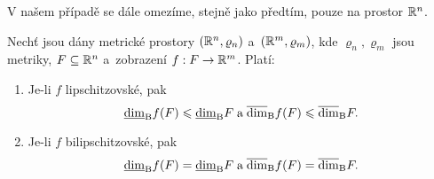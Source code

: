 V našem případě se dále omezíme, stejně jako předtím, pouze na prostor $\mathbb{R}^n$.

\begin{theorem}\label{thm:bc-dimenze-bi-lipschitzovska-zobrazeni}
    Nechť jsou dány metrické prostory $(\mathbb{R}^n,\varrho_n)$ a~$(\mathbb{R}^m,\varrho_m)$, kde $\varrho_n,\varrho_m$ jsou metriky, $F\subseteq\mathbb{R}^n$ a~zobrazení $f:F \rightarrow \mathbb{R}^m$. Platí:
    \begin{enumerate}[label=(\roman*)]
        \item\label{thm:bc-dimenze-lipschitz} Je-li $f$ lipschitzovské, pak
        \[\underline{\dim}_\textup{B}{f(F)}\leqslant\underline{\dim}_\textup{B}{F}\;\text{a}\;\overline{\dim}_\textup{B}{f(F)}\leqslant\overline{\dim}_\textup{B}{F}.\]
        \item\label{thm:bc-dimenze-bilipschitz} Je-li $f$ bilipschitzovské, pak
        \[\underline{\dim}_\textup{B}{f(F)}=\underline{\dim}_\textup{B}{F}\;\text{a}\;\overline{\dim}_\textup{B}{f(F)}=\overline{\dim}_\textup{B}{F}.\]
    \end{enumerate}
\end{theorem}

